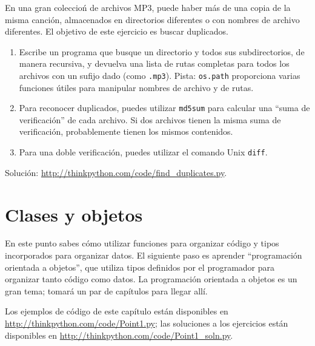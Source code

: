 \documentclass[10pt]{book}
\begin{document}
\begin{exercise}
\label{checksum}

En una gran coleccioń de archivos MP3, puede haber más de una
copia de la misma canción, almacenados en directorios diferentes o con
nombres de archivo diferentes.  El objetivo de este ejercicio es buscar
duplicados.

\begin{enumerate}

\item Escribe un programa que busque un directorio y todos sus
subdirectorios, de manera recursiva, y devuelva una lista de rutas completas
para todos los archivos con un sufijo dado (como {\tt .mp3}).
Pista: {\tt os.path} proporciona varias funciones útiles para
manipular nombres de archivo y de rutas.

\item Para reconocer duplicados, puedes utilizar {\tt md5sum}
para calcular una ``suma de verificación'' de cada archivo.  Si dos archivos tienen
la misma suma de verificación, probablemente tienen los mismos contenidos.

\item Para una doble verificación, puedes utilizar el comando Unix {\tt diff}.

\end{enumerate}

Solución: \url{http://thinkpython.com/code/find_duplicates.py}.

\end{exercise}



\chapter{Clases y objetos}
\label{clobjects}

En este punto sabes cómo utilizar
funciones para organizar código y
tipos incorporados para organizar datos.  El siguiente paso es aprender
``programación orientada a objetos'', que utiliza tipos definidos por el programador
para organizar tanto código como datos.  La programación orientada a objetos es
un gran tema; tomará un par de capítulos para llegar allí.

Los ejemplos de código de este capítulo están disponibles en
\url{http://thinkpython.com/code/Point1.py}; las soluciones
a los ejercicios están disponibles en
\url{http://thinkpython.com/code/Point1_soln.py}.
\end{document}
